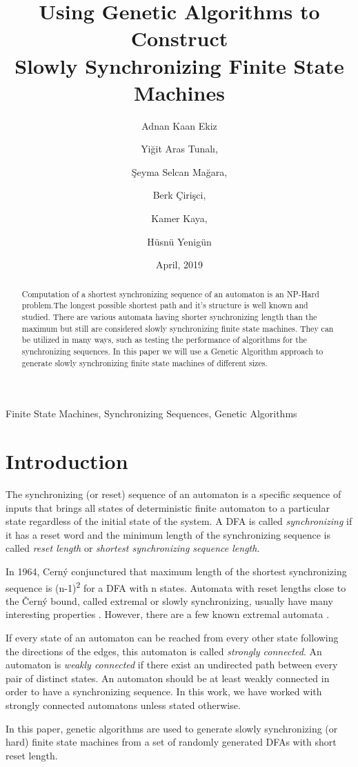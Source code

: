 \documentclass[12pt]{article}
\title{Using Genetic Algorithms to Construct\\ Slowly Synchronizing Finite State Machines}
\author{
Adnan Kaan Ekiz  \and Yiğit Aras Tunalı, \and Şeyma Selcan Mağara, \and Berk Çirişci, \and Kamer Kaya,\and Hüsnü Yenigün  
}
\date{April, 2019}
\begin{document}
\maketitle
\begin{keywords}
Finite State Machines, Synchronizing Sequences, Genetic Algorithms
\end{keywords}

\begin{abstract}
Computation of a shortest synchronizing sequence of an automaton is an NP-Hard problem.The longest possible shortest path and it's structure is well known and studied. There are various automata having shorter synchronizing length than the maximum but still are considered slowly synchronizing finite state machines. They can be utilized in many ways, such as testing the performance of algorithms for the synchronizing sequences. In this paper we will use a Genetic Algorithm approach to generate slowly synchronizing finite state machines of different sizes.
\end{abstract}
\section{Introduction}
The synchronizing (or reset) sequence of an automaton is a specific sequence of inputs that brings all states of deterministic finite automaton to a particular state regardless of the initial state of the system. A DFA is called \textit{synchronizing} if it has a reset word and the minimum length of the synchronizing sequence is called \textit{reset length} or \textit{shortest synchronizing sequence length}.\par
In 1964, Cerný \cite{cerny} conjunctured that maximum length of the shortest synchronizing sequence is (n-1)\textsuperscript{2} for a DFA with n states. Automata with reset lengths close to the Černý bound, called extremal or slowly synchronizing, usually have many interesting properties \cite{podolak_roman_szykula_zielinski_2017}. However, there are a few known extremal automata  \cite{Ananichev_Gusev_Volkov_2010}.

\par If every state of an automaton can be reached from every other state following the directions of the edges, this automaton is called \textit{strongly connected}. An automaton is \textit{weakly connected} if there exist an undirected path between every pair of distinct states. An automaton should be at least weakly connected in order to have a synchronizing sequence. In this work, we have worked with strongly connected automatons unless stated otherwise. \par In this paper, genetic algorithms are used to generate slowly synchronizing (or hard) finite state machines from a set of randomly generated DFAs with short reset length.
\end{document}
